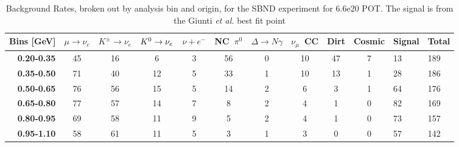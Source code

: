 \begin{table}[]
\centering
\small
\caption{Background Rates, broken out by analysis bin and origin, for the SBND experiment for 6.6e20 POT. The signal is from the Giunti {\em et al.} best fit point}
\label{my-label}
\begin{tabular}{r|cccccccccll}
\multicolumn{1}{l|}{Bins [GeV]} & \multicolumn{1}{l}{$\mu\rightarrow\nu_e$} & \multicolumn{1}{l}{$K^{\pm}\rightarrow \nu_e$} & \multicolumn{1}{l}{$K^0 \rightarrow \nu_{e}$} & \multicolumn{1}{l}{$\nu + e^-$} & \multicolumn{1}{l}{NC~$\pi^0$} & \multicolumn{1}{l}{$\Delta \rightarrow N\gamma$} & \multicolumn{1}{l}{$\nu_{\mu}$~CC} & \multicolumn{1}{l}{Dirt} & \multicolumn{1}{l}{Cosmic} & Signal               & Total \\ \hline
\textbf{0.20-0.35}    & 45                          & 16                          & 6                           & 3                        & 56                         & 0                          & 10                         & 47                       & 7                          & 13                   & 189   \\
\textbf{0.35-0.50}    & 71                          & 40                          & 12                          & 5                        & 33                         & 1                          & 10                         & 13                       & 1                          & 28                   & 186   \\
\textbf{0.50-0.65}    & 76                          & 56                          & 15                          & 5                        & 14                         & 2                          & 6                          & 3                        & 1                          & 64                   & 176   \\
\textbf{0.65-0.80}    & 77                          & 57                          & 14                          & 7                        & 8                          & 2                          & 4                          & 1                        & 0                          & 82                   & 169   \\
\textbf{0.80-0.95}    & 69                          & 58                          & 11                          & 9                        & 5                          & 2                          & 4                          & 1                        & 0                          & 73                   & 157   \\
\textbf{0.95-1.10}    & 58                          & 61                          & 11                          & 5                        & 3                          & 1                          & 3                          & 0                        & 0                          & 57                   & 142   \\

\end{tabular}
\end{table}
